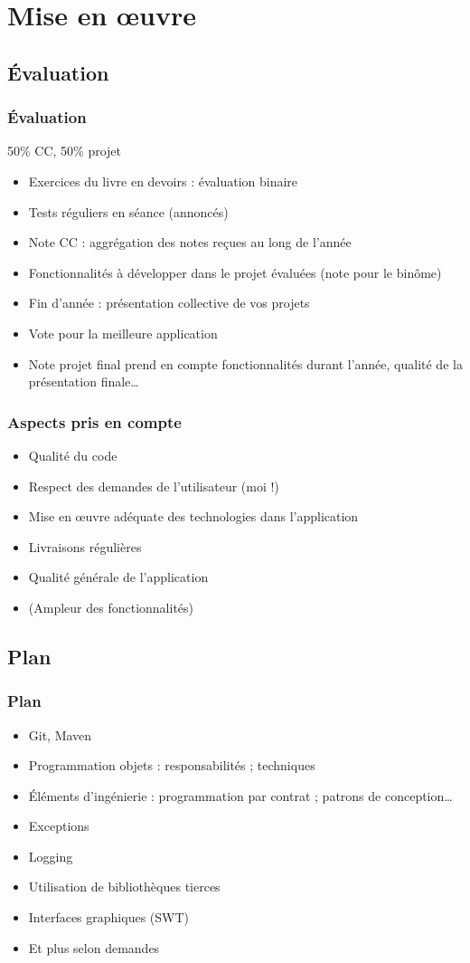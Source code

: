 \documentclass[english, french]{beamer}
\begin{document}
\section{Mise en œuvre}
\subsection{Évaluation}
\begin{frame}
	\frametitle{Évaluation}
	50\% CC, 50\% projet
	\begin{itemize}
		\item Exercices du livre en devoirs : évaluation binaire
		\item Tests réguliers en séance (annoncés)
		\item Note CC : aggrégation des notes reçues au long de l’année
		\item Fonctionnalités à développer dans le projet évaluées (note pour le binôme)
		\item Fin d’année : présentation collective de vos projets
		\item Vote pour la meilleure application
		\item Note projet final prend en compte fonctionnalités durant l’année, qualité de la présentation finale…
	\end{itemize}
\end{frame}

\begin{frame}
	\frametitle{Aspects pris en compte}
	\begin{itemize}
		\item Qualité du code 
		\item Respect des demandes de l’utilisateur (moi !)
		\item Mise en œuvre adéquate des technologies dans l’application
		\item Livraisons régulières
		\item Qualité générale de l’application
		\item (Ampleur des fonctionnalités)
	\end{itemize}
\end{frame}

\subsection{Plan}
\begin{frame}
	\frametitle{Plan}
	\begin{itemize}
		\item Git, Maven
		\item Programmation objets : responsabilités ; techniques
		\item Éléments d’ingénierie : programmation par contrat ; patrons de conception…
		\item Exceptions
		\item Logging
		\item Utilisation de bibliothèques tierces
		\item Interfaces graphiques (SWT)
		\item Et plus selon demandes
	\end{itemize}
\end{frame}
\end{document}
